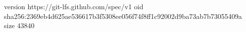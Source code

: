 version https://git-lfs.github.com/spec/v1
oid sha256:2369eb4d625ae536617b3f5308ee056f74f8ff1c92002d9ba73ab7b73055409a
size 43840
